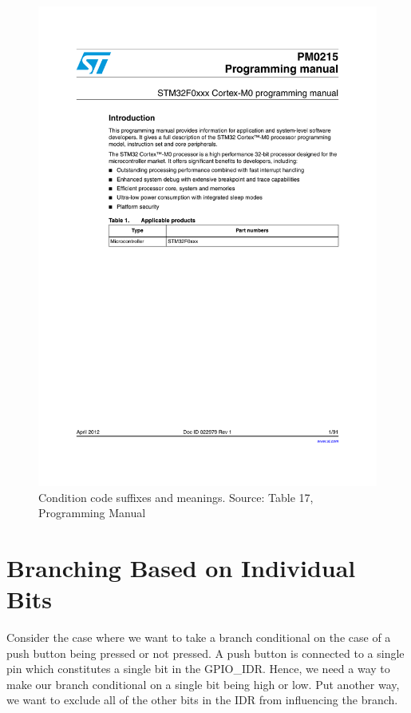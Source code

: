 \begin{figure}
\centering
\includegraphics[page=40, clip=true, trim=110 130 60 434, width=\textwidth]{./stm32f0xx_programming_manual}
\caption{Condition code suffixes and meanings. Source: Table 17, Programming Manual}
\label{fig:cc_suff}
\end{figure}

\section{Branching Based on Individual Bits}
Consider the case where we want to take a branch conditional on the case of a push button being pressed or not pressed. A push button is connected to a single pin which constitutes a single bit in the GPIO\_IDR. Hence, we need a way to make our branch conditional on a single bit being high or low. Put another way, we want to exclude all of the other bits in the IDR from influencing the branch. 

